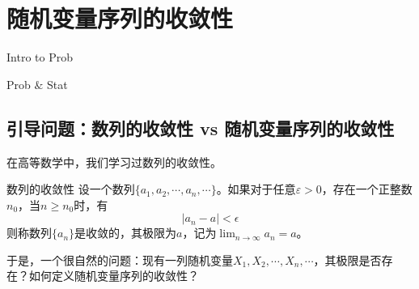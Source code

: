 \chapter{随机变量序列的收敛性}
\begin{introduction}
  \item Intro to Prob   
  \item Prob $\&$ Stat
\end{introduction}
\section{引导问题：数列的收敛性 vs 随机变量序列的收敛性}
在高等数学中，我们学习过数列的收敛性。
\begin{definition}{数列的收敛性}
设一个数列$\{a_1,a_2,\cdots,a_n,\cdots\}$。如果对于任意$\varepsilon > 0$，存在一个正整数$n_0$，当$n\geq n_0$时，有
$$
|a_n - a| < \epsilon
$$
则称数列$\{a_n\}$是收敛的，其极限为$a$，记为$\lim_{n\rightarrow \infty } a_n = a$。
\end{definition}
于是，一个很自然的问题：现有一列随机变量$X_1,X_2,\cdots,X_n,\cdots$，其极限是否存在？如何定义随机变量序列的收敛性？
